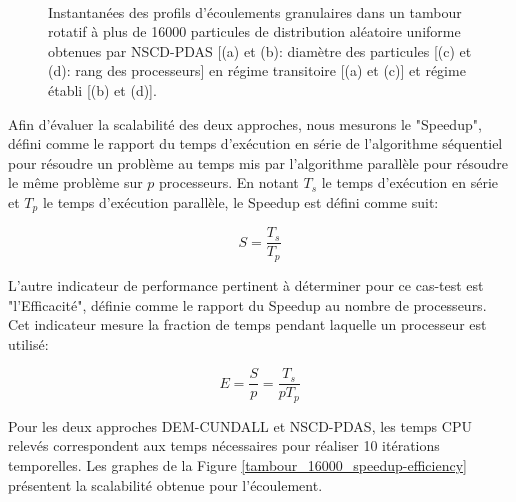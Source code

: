 \begin{figure}[h!]
\hspace{\fill}
   \\
\caption{\label{tambour_16000}Instantanées des profils d'écoulements granulaires dans un tambour rotatif à plus de 16000 particules de distribution aléatoire uniforme obtenues par NSCD-PDAS [(a) et (b): diamètre des particules [(c) et (d): rang des processeurs] en régime transitoire [(a) et (c)] et régime établi [(b) et (d)].}
\end{figure}

 Afin d'évaluer la scalabilité des deux approches, nous mesurons le "Speedup", défini comme le rapport du temps d'exécution en série de l'algorithme séquentiel pour résoudre un problème au temps mis par l'algorithme parallèle pour résoudre le même problème sur $p$ processeurs. En notant $T_s$ le temps d'exécution en série et $T_p$ le temps d'exécution parallèle, le Speedup est défini comme suit:
 
 \begin{equation}
     S = \frac{T_s}{T_p}
 \end{equation}
 
 L'autre indicateur de performance pertinent à déterminer pour ce cas-test est "l'Efficacité", définie comme le rapport du Speedup au nombre de processeurs. Cet indicateur mesure la fraction de temps pendant laquelle un processeur est utilisé:

 \begin{equation}
     E = \frac{S}{p} = \frac{T_s}{pT_p}
 \end{equation}

Pour les deux approches DEM-CUNDALL et NSCD-PDAS, les temps CPU relevés correspondent aux temps nécessaires pour réaliser 10 itérations temporelles. Les graphes de la Figure \ref{tambour_16000_speedup-efficiency} présentent la scalabilité obtenue pour l'écoulement.

